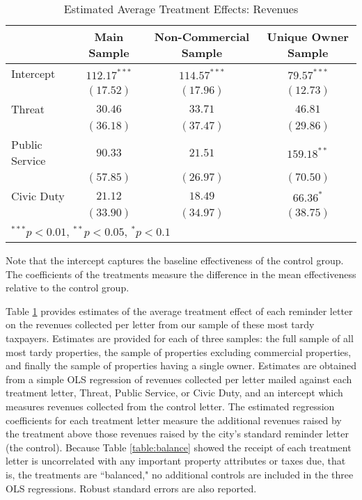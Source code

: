 \documentclass[12pt,titlepage]{article}
\begin{document}
\begin{table}
\caption{Estimated Average Treatment Effects: Revenues}
\begin{center}
\begin{tabular}{|l|c|c|c|}
\hline
               & Main Sample & Non-Commercial Sample & Unique Owner Sample \\
\hline
Intercept      & $112.17^{***}$ & $114.57^{***}$ & $79.57^{***}$ \\
               & $(17.52)$      & $(17.96)$      & $(12.73)$     \\
Threat         & $30.46$        & $33.71$        & $46.81$       \\
               & $(36.18)$      & $(37.47)$      & $(29.86)$     \\
Public Service & $90.33$        & $21.51$        & $159.18^{**}$ \\
               & $(57.85)$      & $(26.97)$      & $(70.50)$     \\
Civic Duty     & $21.12$        & $18.49$        & $66.36^{*}$   \\
               & $(33.90)$      & $(34.97)$      & $(38.75)$     \\
\hline
\multicolumn{4}{l}{\scriptsize{$^{***}p<0.01$, $^{**}p<0.05$, $^*p<0.1$}}
\end{tabular}
\label{dif_mean}
\end{center}
Note that the intercept captures the baseline effectiveness of the
control group. The coefficients of the treatments measure the
difference in the mean effectiveness relative to the control group.
\end{table}

Table \ref{dif_mean} provides estimates of the average treatment effect 
of each reminder letter on the revenues collected per letter from 
our sample of these most tardy taxpayers.   Estimates are provided for 
each of three samples:  the full sample of all most tardy 
properties, the sample of properties excluding commercial 
properties, and finally the sample of properties having a single 
owner.  Estimates are obtained from a simple OLS regression of 
revenues collected per letter mailed against each treatment 
letter, Threat, Public Service, or Civic Duty, and an intercept 
which measures revenues collected from the control letter.  
The estimated regression coefficients for each treatment letter 
measure the additional revenues raised by the treatment above 
those revenues raised by the city's standard reminder letter 
(the control).  Because Table \ref{table:balance} showed the receipt of each 
treatment letter is uncorrelated with any important property 
attributes or taxes due, that is, the treatments are ``balanced,"
no additional controls are included in the three OLS regressions.   
Robust standard errors are also reported.   	
	
\end{document}

